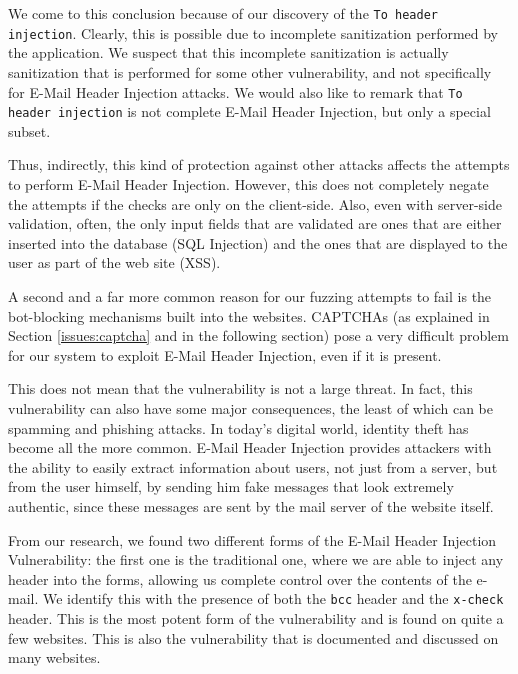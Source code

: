 	We come to this conclusion because of our discovery of the \texttt{To header injection}. Clearly, this is possible due to incomplete sanitization performed by the application. We suspect that this incomplete sanitization is actually sanitization that is performed for some other vulnerability, and not specifically for E-Mail Header Injection attacks. We would also like to remark that \texttt{To header injection} is not complete E-Mail Header Injection, but only a special subset.
	
    Thus, indirectly, this kind of protection against other attacks affects the attempts to perform E-Mail Header Injection. However, this does not completely negate the attempts if the checks are only on the client-side. Also, even with server-side validation, often, the only input fields that are validated are ones that are either inserted into the database (SQL Injection) and the ones that are displayed to the user as part of the web site (XSS).

	A second and a far more common reason for our fuzzing attempts to fail is the bot-blocking mechanisms built into the websites. CAPTCHAs (as explained in Section \ref{issues:captcha} and in the following section) pose a very difficult problem for our system to exploit E-Mail Header Injection, even if it is present.

	This does not mean that the vulnerability is not a large threat. In fact, this vulnerability can also have some major consequences, the least of which can be spamming and phishing attacks.
	In today's digital world, identity theft has become all the more common. E-Mail Header Injection provides attackers with the ability to easily extract information about users, not just from a server, but from the user himself, by sending him fake messages that look extremely authentic, since these messages are sent by the mail server of the website itself.
    
    From our research, we found two different forms of the E-Mail Header Injection Vulnerability: the first one is the traditional one, where we are able to inject any header into the forms, allowing us complete control over the contents of the e-mail. We identify this with the presence of both the \texttt{bcc} header and the \texttt{x-check} header. This is the most potent form of the vulnerability and is found on quite a few websites. This is also the vulnerability that is documented and discussed on many websites.
    
